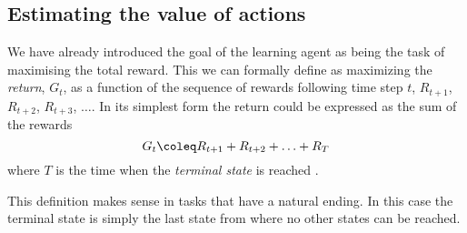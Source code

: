 \documentclass[11pt]{article}
\begin{document}
\maketitle


\subsection{Estimating the value of actions}

We have already introduced the goal of the learning agent as being the
task of maximising the total reward.
This we can formally define as maximizing the \textit{return}, $G_t$, as
a function of the sequence of rewards following time step $t$, $R_{t+1}$,
$R_{t+2}$, $R_{t+3}$, $\hdots$.
In its simplest form the return could be expressed as the sum of the
rewards
\begin{equation}
    G_t \coleq R_{t+1} + R_{t+2} + \hdots + R_{T}
\end{equation}
where $T$ is the time when the \textit{terminal state} is reached
\cite{RLBook}.

This definition makes sense in tasks that have a natural ending.
In this case the terminal state is simply the last state from where no
other states can be reached.

%
%
\end{document}

